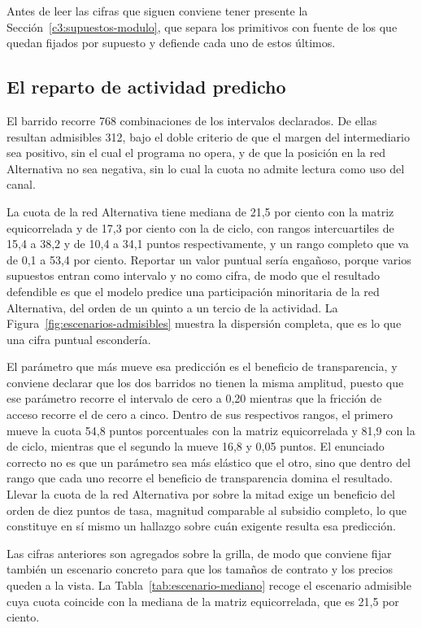 Antes de leer las cifras que siguen conviene tener presente la Sección~\ref{c3:supuestos-modulo}, que separa los primitivos con fuente de los que quedan fijados por supuesto y defiende cada uno de estos últimos.

\subsection{El reparto de actividad predicho}
\label{c4:prediccion-reparto}

El barrido recorre 768 combinaciones de los intervalos declarados. De ellas resultan admisibles 312, bajo el doble criterio de que el margen del intermediario sea positivo, sin el cual el programa no opera, y de que la posición en la red Alternativa no sea negativa, sin lo cual la cuota no admite lectura como uso del canal.

La cuota de la red Alternativa tiene mediana de 21,5 por ciento con la matriz equicorrelada y de 17,3 por ciento con la de ciclo, con rangos intercuartiles de 15,4 a 38,2 y de 10,4 a 34,1 puntos respectivamente, y un rango completo que va de 0,1 a 53,4 por ciento. Reportar un valor puntual sería engañoso, porque varios supuestos entran como intervalo y no como cifra, de modo que el resultado defendible es que el modelo predice una participación minoritaria de la red Alternativa, del orden de un quinto a un tercio de la actividad. La Figura~\ref{fig:escenarios-admisibles} muestra la dispersión completa, que es lo que una cifra puntual escondería.



El parámetro que más mueve esa predicción es el beneficio de transparencia, y conviene declarar que los dos barridos no tienen la misma amplitud, puesto que ese parámetro recorre el intervalo de cero a 0,20 mientras que la fricción de acceso recorre el de cero a cinco. Dentro de sus respectivos rangos, el primero mueve la cuota 54,8 puntos porcentuales con la matriz equicorrelada y 81,9 con la de ciclo, mientras que el segundo la mueve 16,8 y 0,05 puntos. El enunciado correcto no es que un parámetro sea más elástico que el otro, sino que dentro del rango que cada uno recorre el beneficio de transparencia domina el resultado. Llevar la cuota de la red Alternativa por sobre la mitad exige un beneficio del orden de diez puntos de tasa, magnitud comparable al subsidio completo, lo que constituye en sí mismo un hallazgo sobre cuán exigente resulta esa predicción.

Las cifras anteriores son agregados sobre la grilla, de modo que conviene fijar también un escenario concreto para que los tamaños de contrato y los precios queden a la vista. La Tabla~\ref{tab:escenario-mediano} recoge el escenario admisible cuya cuota coincide con la mediana de la matriz equicorrelada, que es 21,5 por ciento.

